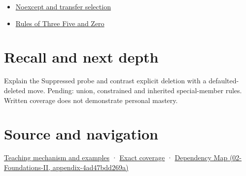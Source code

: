 \begin{itemize}
\tightlist
\item
  \hyperref[appendix-c746afaa47d1]{Noexcept and transfer selection}
\item
  \hyperref[appendix-7679107d057e]{Rules of Three Five and Zero}
\end{itemize}

\section{Recall and next depth}\label{appendix-42e02a12c694-recall-and-next-depth}

Explain the Suppressed probe and contrast explicit deletion with a defaulted-deleted move. Pending: union, constrained and inherited special-member rules. Written coverage does not demonstrate personal mastery.

\section{Source and navigation}\label{appendix-42e02a12c694-source-and-navigation}

\href{Continuous\%20Notes/Computing\%20Foundations\%20-\%20From\%20Bits\%20to\%20C++\%20and\%20Systems\%20APIs\#Let\%20the\%20compiler\%20compose\%20the\%20operations}{Teaching mechanism and examples} · \hyperref[appendix-fd090d982a15-m009---parts-127-147]{Exact coverage} · \href{../02-Foundations-II/main.pdf\#nameddest=appendix-4ad47bdd269a}{Dependency Map (02-Foundations-II, appendix-4ad47bdd269a)}
